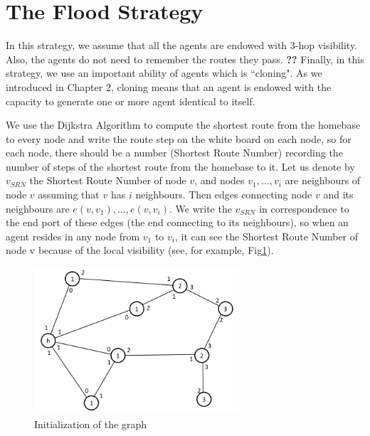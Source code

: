\section{The Flood Strategy}
In this strategy, we assume that all the agents are endowed with 3-hop visibility. Also,   the agents do not need to remember the routes they pass. \color{blue} {\bf ??} \color{black}
Finally, in this strategy, we use an important ability of agents which is ``cloning". As we introduced in Chapter 2, cloning means that an agent is endowed with the capacity to generate one or more agent identical to itself. 

We use the Dijkstra Algorithm to compute the shortest route from the homebase to every node and write the route step on the white board on each node, so for each node, there should be a number (Shortest Route Number) recording the number of steps of the shortest route from the homebase to it. Let us denote by $v_{SRN}$ the Shortest Route Number of node $v$, and nodes ${v_1, \ldots, v_i}$ are neighbours of node $v$ assuming that $v$ has $i$ neighbours. Then edges connecting node $v$ and its neighbours are $e(v, v_1), \ldots, e(v, v_i)$. We write the $v_{SRN}$ in correspondence to the   end port of these edges (the end connecting to its neighbours), so when an agent resides in any node from $v_1$ to $v_i$, it can see the Shortest Route Number of node v because of the local visibility (see, for example,   Fig\ref{fig:Arbi1}).

\begin{figure}[H]
  \centering  
  \includegraphics[width=3in]{figures/Arbi1.png}
  \caption{Initialization of the graph}\label{fig:Arbi1}
\end{figure}

